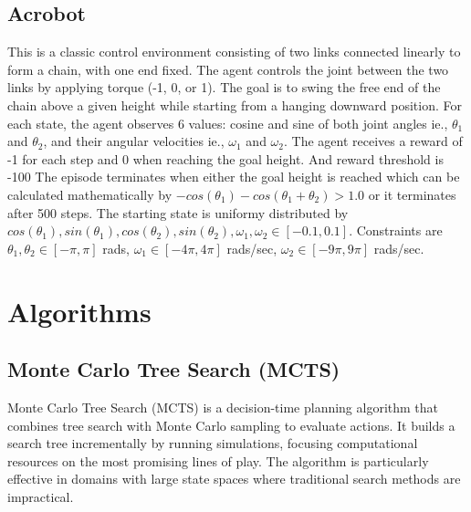 \documentclass{article}
\begin{document}
\subsection{Acrobot}

This is a classic control environment consisting of two links connected linearly to form a chain, with one end fixed.
The agent controls the joint between the two links by applying torque (-1, 0, or 1).
The goal is to swing the free end of the chain above a given height while starting from a hanging downward position.
For each state, the agent observes 6 values: cosine and sine of both joint angles ie., $\theta_1$ and $\theta_2$, and their angular velocities ie., $\omega_1$ and $\omega_2$.
The agent receives a reward of -1 for each step and 0 when reaching the goal height. And reward threshold is -100
The episode terminates when either the goal height is reached which can be calculated mathematically by $-cos(\theta_1)-cos(\theta_1+\theta_2)>1.0$ or it terminates after 500 steps.
The starting state is uniformy distributed by $cos(\theta_1), sin(\theta_1), cos(\theta_2), sin(\theta_2), \omega_1, \omega_2 \in [-0.1,0.1]$.
Constraints are $\theta_1, \theta_2 \in [-\pi, \pi]$ rads, $\omega_1 \in [-4\pi, 4\pi]$ rads/sec, $\omega_2 \in [-9\pi, 9\pi]$ rads/sec.





\section{Algorithms}

\subsection{Monte Carlo Tree Search (MCTS)}

Monte Carlo Tree Search (MCTS) is a decision-time planning algorithm that combines tree search with Monte Carlo sampling to evaluate actions. 
It builds a search tree incrementally by running simulations, focusing computational resources on the most promising lines of play. 
The algorithm is particularly effective in domains with large state spaces where traditional search methods are impractical.
\end{document}
